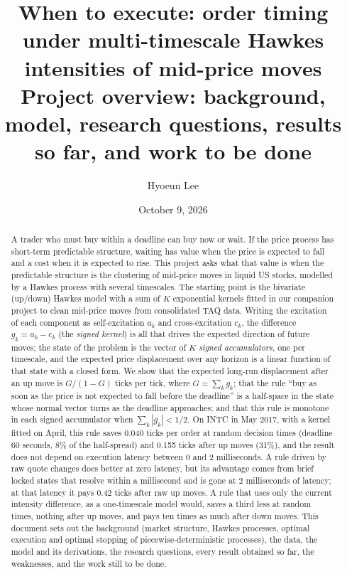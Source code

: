 \documentclass[11pt]{article}
\title{When to execute: order timing under multi-timescale Hawkes intensities of mid-price moves\\[6pt]
\large Project overview: background, model, research questions, results so far, and work to be done}
\author{Hyoeun Lee}
\date{October 9, 2026}
\theoremstyle{definition}
\theoremstyle{remark}
\begin{document}
\maketitle

\begin{abstract}
\noindent
A trader who must buy within a deadline can buy now or wait. If the price process has short-term predictable structure, waiting has value when the price is expected to fall and a cost when it is expected to rise. This project asks what that value is when the predictable structure is the clustering of mid-price moves in liquid US stocks, modelled by a Hawkes process with several timescales. The starting point is the bivariate (up/down) Hawkes model with a sum of $K$ exponential kernels fitted in our companion project to clean mid-price moves from consolidated TAQ data. Writing the excitation of each component as self-excitation $a_k$ and cross-excitation $c_k$, the difference $g_k = a_k - c_k$ (the \emph{signed kernel}) is all that drives the expected direction of future moves; the state of the problem is the vector of $K$ \emph{signed accumulators}, one per timescale, and the expected price displacement over any horizon is a linear function of that state with a closed form. We show that the expected long-run displacement after an up move is $G/(1-G)$ ticks per tick, where $G = \sum_k g_k$; that the rule ``buy as soon as the price is not expected to fall before the deadline'' is a half-space in the state whose normal vector turns as the deadline approaches; and that this rule is monotone in each signed accumulator when $\sum_k |g_k| < 1/2$. On INTC in May 2017, with a kernel fitted on April, this rule saves 0.040 ticks per order at random decision times (deadline 60 seconds, 8\% of the half-spread) and 0.155 ticks after up moves (31\%), and the result does not depend on execution latency between 0 and 2 milliseconds. A rule driven by raw quote changes does better at zero latency, but its advantage comes from brief locked states that resolve within a millisecond and is gone at 2 milliseconds of latency; at that latency it pays 0.42 ticks after raw up moves. A rule that uses only the current intensity difference, as a one-timescale model would, saves a third less at random times, nothing after up moves, and pays ten times as much after down moves. This document sets out the background (market structure, Hawkes processes, optimal execution and optimal stopping of piecewise-deterministic processes), the data, the model and its derivations, the research questions, every result obtained so far, the weaknesses, and the work still to be done.
\end{abstract}
\end{document}
